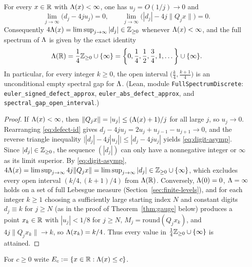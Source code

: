 \begin{theorem}\label{thm:full-spectrum}
For every $x\in\mathbb{R}$ with $\Lambda(x)<\infty$, one has $u_j=O(1/j)\to0$ and
\begin{equation}\label{eq:digit-asymp}
\lim_{j\to\infty}\bigl(d_j-4ju_j\bigr)=0,\qquad
\lim_{j\to\infty}\bigl(|d_j|-4j\|Q_jx\|\bigr)=0.
\end{equation}
Consequently $4\Lambda(x)=\limsup_{j\to\infty}|d_j|\in\mathbb{Z}_{\ge0}$ whenever
$\Lambda(x)<\infty$, and the full spectrum of $\Lambda$ is given by the exact identity
\begin{equation}\label{eq:full-spectrum}
\Lambda(\mathbb{R})=\frac14\mathbb{Z}_{\ge0}\cup\{\infty\}
=\left\{0,\frac14,\frac12,\frac34,1,\dots\right\}\cup\{\infty\}.
\end{equation}
In particular, for every integer $k\ge0$, the open interval
$\bigl(\frac{k}{4},\frac{k+1}{4}\bigr)$ is an unconditional empty spectral gap
for $\Lambda$.
(Lean, module \texttt{FullSpectrumDiscrete}:
\texttt{euler\_\allowbreak signed\_\allowbreak defect\_\allowbreak approx},
\texttt{euler\_\allowbreak abs\_\allowbreak defect\_\allowbreak approx}, and
\texttt{spectral\_\allowbreak gap\_\allowbreak open\_\allowbreak interval}.)
\end{theorem}

\begin{proof}
If $\Lambda(x)<\infty$, then $\|Q_jx\|=|u_j|\le(\Lambda(x)+1)/j$ for all large $j$,
so $u_j\to0$. Rearranging \eqref{eq:defect-id} gives
$d_j-4ju_j=2u_j+u_{j-1}-u_{j+1}\to0$, and the reverse triangle inequality
$\bigl||d_j|-4j|u_j|\bigr|\le|d_j-4ju_j|$ yields \eqref{eq:digit-asymp}.
Since $|d_j|\in\mathbb{Z}_{\ge0}$, the sequence $(|d_j|)$ can only have a nonnegative
integer or $\infty$ as its limit superior. By \eqref{eq:digit-asymp},
$4\Lambda(x)=\limsup_{j\to\infty}4j\|Q_jx\|=\limsup_{j\to\infty}|d_j|\in\mathbb{Z}_{\ge0}\cup\{\infty\}$,
which excludes every open interval $(k/4,(k+1)/4)$ from $\Lambda(\mathbb{R})$.
Conversely, $\Lambda(0)=0$, $\Lambda=\infty$ holds on a set of full Lebesgue measure
(Section~\ref{sec:finite-levels}), and for each integer $k\ge1$ choosing a
sufficiently large starting index $N$ and constant digits $d_j\equiv k$ for
$j\ge N$ (as in the proof of Theorem~\ref{thm:gauge} below) produces a point
$x_k\in\mathbb{R}$ with $|u_j|<1/8$ for $j\ge N$, $M_j=\mathrm{round}(Q_jx_k)$, and
$4j\|Q_jx_k\|\to k$, so $\Lambda(x_k)=k/4$. Thus every value in
$\frac14\mathbb{Z}_{\ge0}\cup\{\infty\}$ is attained.
\end{proof}

For $c\ge0$ write $E_c:=\{x\in\mathbb{R}:\Lambda(x)\le c\}$.

